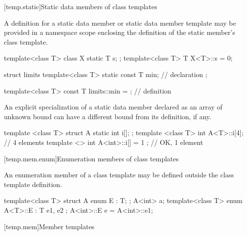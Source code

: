 [temp.static]{Static data members of class templates}

\pnum
{}%
A definition for a static data member or static data member template may be
provided in a namespace scope enclosing the definition of the static member's
class template.
\begin{example}
\begin{codeblock}
template<class T> class X {
  static T s;
};
template<class T> T X<T>::s = 0;

struct limits {
  template<class T>
    static const T min;                 // declaration
};

template<class T>
  const T limits::min = { };            // definition
\end{codeblock}
\end{example}

\pnum
An explicit specialization of a static data member declared as an array of unknown
bound can have a different bound from its definition, if any.
\begin{example}
\begin{codeblock}
template <class T> struct A {
  static int i[];
};
template <class T> int A<T>::i[4];      // 4 elements
template <> int A<int>::i[] = { 1 };    // OK, 1 element
\end{codeblock}
\end{example}

[temp.mem.enum]{Enumeration members of class templates}

\pnum
An enumeration member of a class template may be defined outside the class
template definition.
\begin{example}
\begin{codeblock}
template<class T> struct A {
  enum E : T;
};
A<int> a;
template<class T> enum A<T>::E : T { e1, e2 };
A<int>::E e = A<int>::e1;
\end{codeblock}
\end{example}

[temp.mem]{Member templates}

